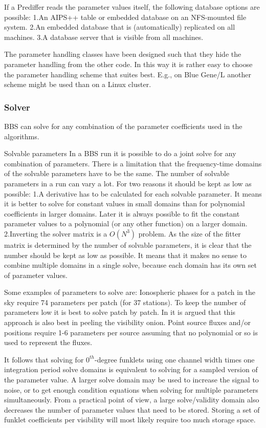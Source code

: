 \documentclass[10pt]{lofar}
\begin{document}
If a Prediffer reads the parameter values itself, the following database options are possible:
1.An AIPS++ table or embedded database on an NFS-mounted file system.
2.An embedded database that is (automatically) replicated on all machines.
3.A database server that is visible from all machines.

The parameter handling classes have been designed such that they hide the parameter handling from the other code. In this way it is rather easy to choose the parameter handling scheme that suites best. E.g., on Blue Gene/L another scheme might be used than on a Linux cluster.

\subsubsection{Solver}
\label{subsubsec:design-solver}
BBS can solve for any combination of the parameter coefficients used in the algorithms.

Solvable parameters
In a BBS run it is possible to do a joint solve for any combination of parameters. There is a limitation that the frequency-time domains of the solvable parameters have to be the same.
The number of solvable parameters in a run can vary a lot. For two reasons it should be kept as low as possible:
1.A derivative has to be calculated for each solvable parameter. It means it is better to solve for constant values in small domains than for polynomial coefficients in larger domains. Later it is always possible to fit the constant parameter values to a polynomial (or any other function) on a larger domain.
2.Inverting the solver matrix is a $O(N^3)$ problem. As the size of the fitter matrix is determined by the number of solvable parameters, it is clear that the number should be kept as low as possible.
It means that it makes no sense to combine multiple domains in a single solve, because each domain has its own set of parameter values.

Some examples of parameters to solve are:
Ionospheric phases for a patch in the sky require 74 parameters per patch (for 37 stations).
To keep the number of parameters low it is best to solve patch by patch. In  it is argued that this approach is also best in peeling the visibility onion.
Point source fluxes and/or positions require 1-6 parameters per source assuming that no polynomial or so is used to represent the fluxes.


It follows that solving for $0^{th}$-degree funklets using one channel width times one integration period solve domains is equivalent to solving for a sampled version of the parameter value. A larger solve domain may be used to increase the signal to noise, or to get enough condition equations when solving for multiple parameters simultaneously. From a practical point of view, a large solve/validity domain also decreases the number of parameter values that need to be stored. Storing a set of funklet coefficients per visibility will most likely require too much storage space.
\end{document}
